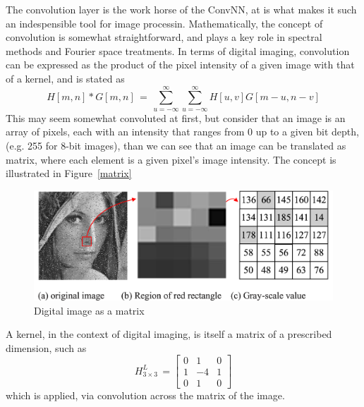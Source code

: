 \documentclass[letterpaper,12pt]{article}
\newcommand{\figref}[1]{Figure~\ref{#1}}
\begin{document}
The convolution layer is the work horse of the ConvNN, at is what makes it such an indespensible tool for image processin. Mathematically, the concept of convolution is somewhat straightforward, and plays a key role in spectral methods and Fourier space treatments. In terms of digital imaging, convolution can be expressed as \cite{deep} the product of the pixel intensity of a given image with that of a kernel, and is stated as
\begin{equation}
H[m,n] * G[m,n] \, = \, \sum_{u=- \infty}^{\infty} \sum_{u=- \infty}^{\infty} H[u,v] G[m-u, n-v]
\end{equation}
This may seem somewhat convoluted at first, but consider that an image is an array of pixels, each with an intensity that ranges from 0 up to a given bit depth, (e.g. 255 for 8-bit images), than we can see that an image can be translated as matrix, where each element is a given pixel's image intensity. The concept is illustrated in \figref{matrix}
\begin{figure}[htbp]
\begin{center}
\includegraphics[scale=0.1]{images/lena.png}
\caption{Digital image as a matrix \cite{lena}}
\label{lena}
\end{center}
\end{figure}
A kernel, in the context of digital imaging, is itself a matrix of a prescribed dimension, such as 
\begin{equation}
H_{3 \times 3}^L \, = 
\begin{bmatrix}
  0 & 1  & 0 \\
  1 & -4 & 1 \\
  0 & 1  & 0
\end{bmatrix}
\label{lap_3x3}
\end{equation}
which is applied, via convolution across the matrix of the image.
\newpage


\end{document}
